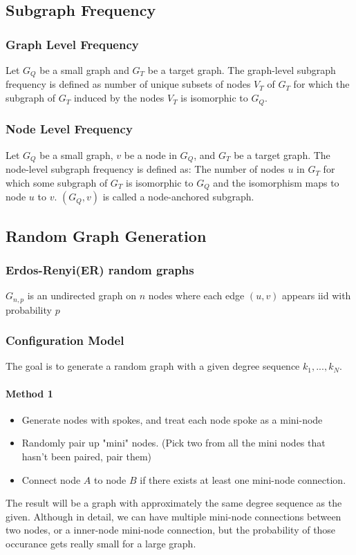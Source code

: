 \subsection{Subgraph Frequency} 
\subsubsection{Graph Level Frequency} 
Let $G_Q$ be a small graph and $G_T$ be a target graph. The graph-level subgraph frequency is defined as number of unique subsets of nodes $V_T$ of $G_T$ for which the subgraph of $G_T$ induced by the nodes $V_T$ is isomorphic to $G_Q$.

\subsubsection{Node Level Frequency} 
Let $G_Q$ be a small graph, $v$ be a node in $G_Q$, and $G_T$ be a target graph. The node-level subgraph frequency is defined as: The number of nodes $u$ in $G_T$ for which some subgraph of $G_T$ is isomorphic to $G_Q$ and the isomorphism maps to node $u$ to $v$. $(G_Q, v)$ is called a node-anchored subgraph. 

\subsection{Random Graph Generation} 
\subsubsection{Erdos-Renyi(ER) random graphs}
$G_{n,p}$ is an undirected graph on $n$ nodes where each edge $(u,v)$ appears iid with probability $p$

\subsubsection{Configuration Model}
The goal is to generate a random graph with a given degree sequence $k_1, ...,k_N$.  

\paragraph{Method 1} 
    \begin{itemize}
        \item Generate nodes with spokes, and treat each node spoke as a mini-node
        \item Randomly pair up "mini" nodes. (Pick two from all the mini nodes that hasn't been paired, pair them)
        \item Connect node $A$ to node $B$ if there exists at least one mini-node connection. 
    \end{itemize}
The result will be a graph with approximately the same degree sequence as the given. Although in detail, we can have multiple mini-node connections between two nodes, or a inner-node mini-node connection, but the probability of those occurance gets really small for a large graph. 

